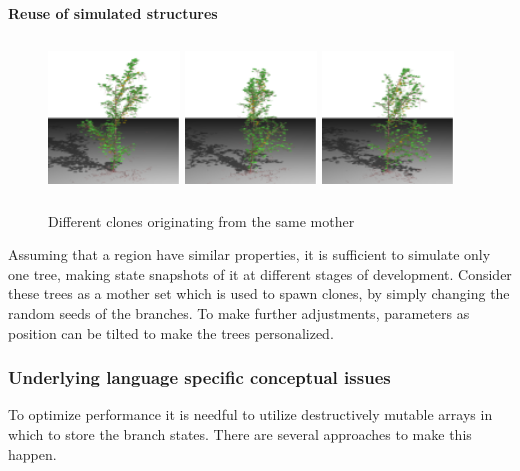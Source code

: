 \paragraph{Reuse of simulated structures}
\begin{figure}[htb]
        \centering
        \includegraphics[height=4cm,width=3.5cm, angle=0]{images/clone0}
        \includegraphics[height=4cm,width=3.5cm, angle=0]{images/clone1}
        \includegraphics[height=4cm,width=3.5cm, angle=0]{images/clone2}
        \caption{Different clones originating from the same mother}
        \label{fig:clones}
\end{figure}
Assuming that a region have similar properties, it is sufficient to simulate
only one tree, making state snapshots of it at different stages of
development. Consider these trees as a mother set which is used to spawn
clones, by simply changing the random seeds of the branches. To make further
adjustments, parameters as position can be tilted to make the trees
personalized.


\subsubsection{Underlying language specific conceptual issues}
To optimize performance it is needful to utilize destructively mutable arrays
in which to store the branch states. There are several approaches to make this
happen.
